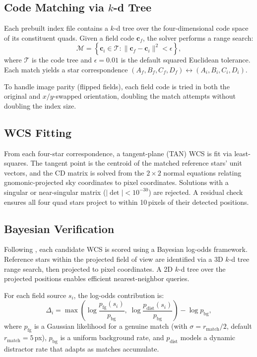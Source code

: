 \documentclass[twocolumn, 10pt]{article}
\begin{document}
\subsection{Code Matching via $k$-d Tree} \label{sec:matching}

Each prebuilt index file contains a $k$-d tree over the four-dimensional
code space of its constituent quads. Given a field code $\mathbf{c}_f$,
the solver performs a range search:
\begin{equation}
    \mathcal{M} = \left\{ \mathbf{c}_i \in \mathcal{T} :
    \|\mathbf{c}_f - \mathbf{c}_i\|^2 < \epsilon \right\},
\end{equation}
where $\mathcal{T}$ is the code tree and $\epsilon = 0.01$ is the default
squared Euclidean tolerance. Each match yields a star correspondence
$(A_f, B_f, C_f, D_f) \leftrightarrow (A_i, B_i, C_i, D_i)$.

To handle image parity (flipped fields), each field code is tried in both
the original and $x/y$-swapped orientation, doubling the match attempts
without doubling the index size.

\subsection{WCS Fitting} \label{sec:fitting}

From each four-star correspondence, a tangent-plane (TAN) WCS is fit via
least-squares. The tangent point is the centroid of the matched reference
stars' unit vectors, and the CD matrix is solved from the $2 \times 2$
normal equations relating gnomonic-projected sky coordinates to pixel
coordinates. Solutions with a singular or near-singular matrix
($|\det| < 10^{-30}$) are rejected. A residual check ensures all four
quad stars project to within 10\,pixels of their detected positions.

\subsection{Bayesian Verification} \label{sec:verify}

Following \citet{lang2010}, each candidate WCS is scored using a
Bayesian log-odds framework. Reference stars within the projected field
of view are identified via a 3D $k$-d tree range search, then projected
to pixel coordinates. A 2D $k$-d tree over the projected positions enables
efficient nearest-neighbor queries.

For each field source $s_i$, the log-odds contribution is:
\begin{equation} \label{eq:logodds}
    \Delta_i = \max\left(\log \frac{p_{\text{fg}}(s_i)}{p_{\text{bg}}},\;
    \log \frac{p_{\text{dist}}(s_i)}{p_{\text{bg}}} \right) -
    \log p_{\text{bg}},
\end{equation}
where $p_{\text{fg}}$ is a Gaussian likelihood for a genuine match
(with $\sigma = r_{\text{match}} / 2$, default $r_{\text{match}} = 5$\,px),
$p_{\text{bg}}$ is a uniform background rate, and $p_{\text{dist}}$
models a dynamic distractor rate that adapts as matches accumulate.
\end{document}
